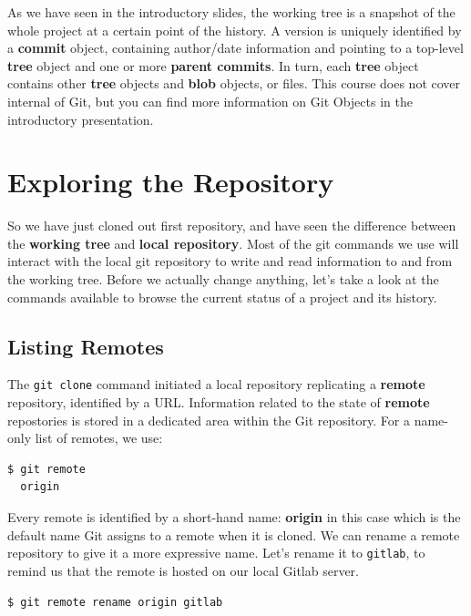 \documentclass{../common/tufte-latex/tufte-handout}
\begin{document}
As we have seen in the introductory slides, the working tree is a snapshot of the whole project at a certain point of the history.
A version is uniquely identified by a \textbf{commit} object, containing author/date information and pointing to a top-level \textbf{tree} object and one or more \textbf{parent commits}.
In turn, each \textbf{tree} object contains other \textbf{tree} objects and \textbf{blob} objects, or files.
This course does not cover internal of Git, but you can find more information on Git Objects in the introductory presentation.

\section{Exploring the Repository}

So we have just cloned out first repository, and have seen the difference between the \textbf{working tree} and \textbf{local repository}.
Most of the git commands we use will interact with the local git repository to write and read information to and from the working tree.
Before we actually change anything, let's take a look at the commands available to browse the current status of a project and its history.

\subsection{Listing Remotes}

The \texttt{git clone} command initiated a local repository replicating a \textbf{remote} repository, identified by a URL.
Information related to the state of \textbf{remote} repostories is stored in a dedicated area within the Git repository.
For a name-only list of remotes, we use:

\begin{lstlisting}[style=BashInputStyle]
  $ git remote
  origin
\end{lstlisting}

Every remote is identified by a short-hand name: \textbf{origin} in this case which is the default name Git assigns to a remote when it is cloned.
We can rename a remote repository to give it a more expressive name.
Let's rename it to \texttt{gitlab}, to remind us that the remote is hosted on our local Gitlab server.

\begin{lstlisting}[style=BashInputStyle]
  $ git remote rename origin gitlab
\end{lstlisting}
\end{document}
